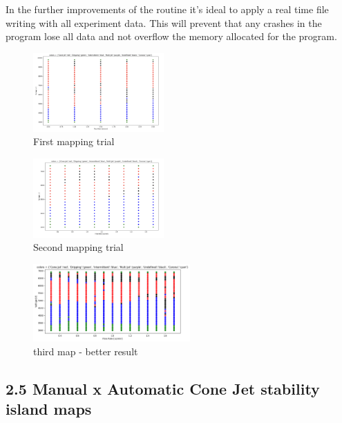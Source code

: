     In the further improvements of the routine it's ideal to apply a real time file writing with all experiment data.
    This will prevent that any crashes in the program lose all data and not overflow the memory allocated for the program.


    \begin{multicols}{3}


        \begin{figure}[H]
            \center
            \includegraphics[width=5cm]{images/map1.png}
            \caption{First mapping trial}
        \end{figure}

        \begin{figure}[H]
            \center
            \includegraphics[width=5cm]{images/map2.png}
            \caption{Second mapping trial}
        \end{figure}


        \begin{figure}[H]
            \center
            \includegraphics[width=6cm]{images/map3.png}
            \caption{third map - better result}
        \end{figure}

    \end{multicols}



\subsection*{2.5 Manual x Automatic Cone Jet stability island maps}

